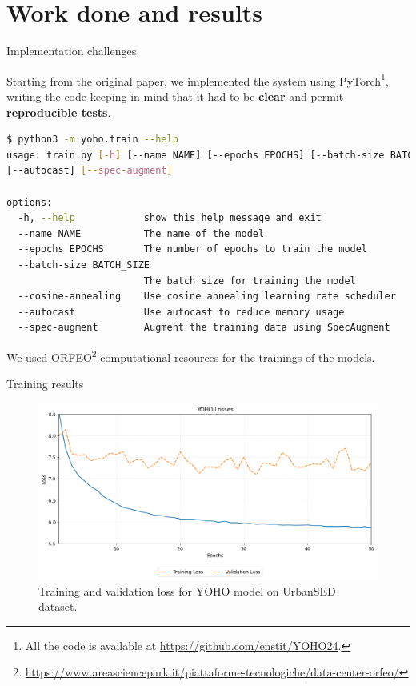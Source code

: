 \section[Work done and results]{Work done and results}	

	\begin{frame}[fragile]{Implementation challenges}
	
		Starting from the original paper, we implemented the system using PyTorch\footnote{All the code is available at \url{https://github.com/enstit/YOHO24}.},
		writing the code keeping in mind that it had to be \textbf{clear} and permit \textbf{reproducible tests}.
		
		\begin{lstlisting}[basicstyle=\tiny\ttfamily\color{white},language=bash,backgroundcolor=\color{black},caption={Training script parameters}, label={trainingParams},captionpos=b]
$ python3 -m yoho.train --help
usage: train.py [-h] [--name NAME] [--epochs EPOCHS] [--batch-size BATCH_SIZE] [--cosine-annealing]
[--autocast] [--spec-augment]

options:
  -h, --help            show this help message and exit
  --name NAME           The name of the model
  --epochs EPOCHS       The number of epochs to train the model
  --batch-size BATCH_SIZE
                        The batch size for training the model
  --cosine-annealing    Use cosine annealing learning rate scheduler
  --autocast            Use autocast to reduce memory usage
  --spec-augment        Augment the training data using SpecAugment
		\end{lstlisting}

		We used ORFEO\footnote{\url{https://www.areasciencepark.it/piattaforme-tecnologiche/data-center-orfeo/}} computational resources for the trainings of the models.
		
	\end{frame}
	
	\begin{frame}{Training results}
		\begin{figure}
			\centering
			\includegraphics[width=.8\textwidth]{images/losses.png}

			\caption{Training and validation loss for YOHO model on UrbanSED dataset.}
			\label{fig:trainingLosses}
		\end{figure}
	\end{frame}
